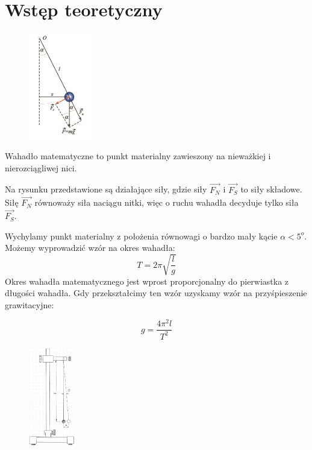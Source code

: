 \documentclass[a4paper,11pt]{article}
\begin{document}
\section{Wstęp teoretyczny}
\begin{figure}
\includegraphics[width=0.25\textwidth]{./wahadlowstep}
\end{figure}
Wahadło matematyczne to punkt materialny zawieszony na nieważkiej i nierozciągliwej nici.

Na rysunku przedstawione są działające siły, gdzie siły $\vec{F_{N}}$ i $\vec{F_{S}}$ to siły składowe. Siłę $\vec{F_{N}}$ równoważy siła naciągu nitki, więc o ruchu wahadła decyduje tylko siła $\vec{F_{S}}$. 

Wychylamy punkt materialny z położenia równowagi o bardzo mały kącie $\alpha< 5^{o}$. Możemy wyprowadzić wzór na okres wahadła: 
$$T=2\pi\sqrt{\dfrac{l}{g}}$$
Okres wahadła matematycznego jest wprost proporcjonalny do pierwiastka z długości wahadła.
Gdy przekształcimy ten wzór uzyskamy wzór na przyśpieszenie grawitacyjne:

$$g=\frac{4\pi^{2}l}{T^{2}}$$

\begin{figure}
\vspace*{-1.5 cm}
\includegraphics[width=0.18\textwidth]{./wahadlo}
\vspace*{-2.5 cm}
\end{figure}
\end{document}
